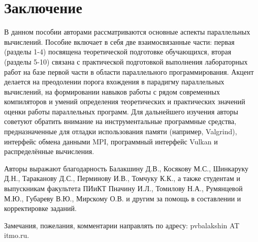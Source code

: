 \section*{Заключение}

В данном пособии авторами рассматриваются основные аспекты параллельных вычислений. Пособие включает в себя две взаимосвязанные части: первая (разделы 1-4) посвящена теоретической подготовке обучающихся, вторая (разделы 5-10) связана с практической подготовкой выполнения лабораторных работ на базе первой части в области параллельного программирования. Акцент делается на преодолении порога вхождения в парадигму параллельных вычислений, на формировании навыков работы с рядом современных компиляторов и умений определения теоретических и практических значений оценки работы параллельных программ. Для дальнейшего изучения авторы советуют обратить внимание на инструментальные программные средства, предназначенные для отладки использования памяти (например, Valgrind), интерфейс обмена данными MPI, программный интерфейс Vulkan и распределённые вычисления.

Авторы выражают благодарность Балакшину Д.В., Косякову М.С., Шинкаруку Д.Н., Тараканову Д.С., Перминову И.В., Томчуку К.К., а также студентам и выпускникам факультета ПИиКТ Пначину И.Л., Томилову Н.А., Румянцевой М.Ю., Губареву В.Ю., Мирскому О.В. и другим за помощь в составлении и корректировке заданий.

Замечания, пожелания, комментарии направлять по адресу: pvbalakshin AT itmo.ru. 
